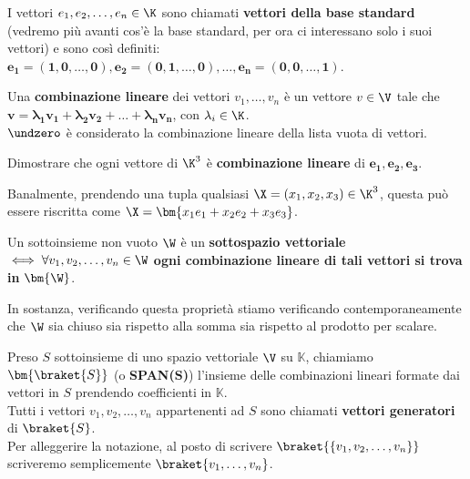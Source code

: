 \documentclass[11pt, a4paper, titlepage, oneside]{scrbook}
\begin{document}
\begin{Definizione}
\label{def-vett-bas-can}
I vettori $e_1, e_2, \ldots, e_n \in \K$ sono chiamati \textbf{vettori della base standard} (vedremo più avanti cos'è la base standard, per ora ci interessano solo i suoi vettori) e sono così definiti: $\bm{e_1 = (1,0,\ldots,0), e_2 = (0,1,\ldots,0), \ldots, e_n = (0,0,\ldots,1)}$.
\end{Definizione}

\begin{Definizione}
\label{def-comb-line}
Una \textbf{combinazione lineare} dei vettori $v_1, \ldots, v_n$ è un vettore $v \in \V$ tale che \mbox{$\bm{v = \lambda_1 v_1 + \lambda_2 v_2 + \ldots + \lambda_n v_n}$}, con $\lambda_i \in \K$. \\
\NB $\undzero$ è considerato la combinazione lineare della lista vuota di vettori.
\end{Definizione}

\Esempio \nopagebreak

Dimostrare che ogni vettore di $\K^3$ è \textbf{combinazione lineare} di $\bm{e_1, e_2, e_3}$. \nopagebreak

Banalmente, prendendo una tupla qualsiasi $\X = (x_1, x_2, x_3) \in \K^3$, questa può essere riscritta come $\X = \bm{x_1 e_1 + x_2 e_2 + x_3 e_3}$.

\begin{Proposizione}[]
\label{propos-comb-lin}
Un sottoinsieme non vuoto $\W$ è un \textbf{sottospazio vettoriale} $\iff \forall v_1, v_2, \ldots, v_n \in \W$ \textbf{ogni combinazione lineare di tali vettori si trova in} $\bm{\W}$. 
\end{Proposizione}
In sostanza, verificando questa proprietà stiamo verificando contemporaneamente che $\W$ sia chiuso sia rispetto alla somma sia rispetto al prodotto per scalare.

\begin{Definizione}[SPAN]
\label{def-Span}
Preso $S$ sottoinsieme di uno spazio vettoriale $\V$ su $\mathbb{K}$, chiamiamo $\bm{\braket{S}}$ (o \textbf{SPAN($\bm{S}$)}) l'insieme delle combinazioni lineari formate dai vettori in $S$ prendendo coefficienti in $\mathbb{K}$. \\
Tutti i vettori $v_1, v_2, \ldots, v_n$ appartenenti ad $S$ sono chiamati \textbf{vettori generatori} di $\braket{S}$. \\
\NB Per alleggerire la notazione, al posto di scrivere $\braket{\{v_1, v_2, \ldots, v_n\}}$ scriveremo semplicemente $\braket{v_1, \ldots, v_n}$.
\end{Definizione}
\end{document}
